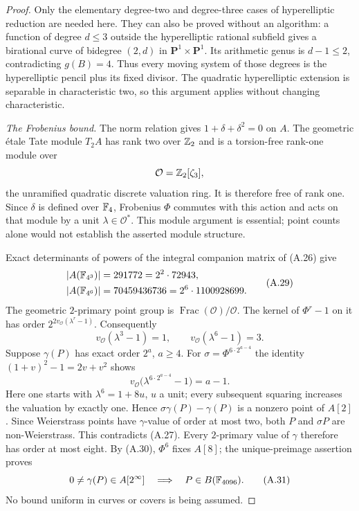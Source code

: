 \begin{proof}
Only the elementary degree-two and degree-three cases of
hyperelliptic reduction are needed here. They can also be
proved without an algorithm: a function of degree $d\le3$
outside the hyperelliptic rational subfield gives a
birational curve of bidegree $(2,d)$ in
$\mathbf P^1\times\mathbf P^1$. Its arithmetic genus is
$d-1\le2$, contradicting $g(B)=4$. Thus every moving
system of those degrees is the hyperelliptic pencil plus
its fixed divisor. The quadratic hyperelliptic extension
is separable in characteristic two, so this argument
applies without changing characteristic.

\emph{The Frobenius bound.}
The norm relation gives $1+\delta+\delta^2=0$ on $A$.
The geometric \'etale Tate module $T_2A$ has rank two
over $\mathbb Z_2$ and is a torsion-free rank-one module over
\[
 \mathcal O=\mathbb Z_2[\zeta_3],
\]
the unramified quadratic discrete valuation ring. It is
therefore free of rank one. Since $\delta$ is defined over
$\mathbb F_4$, Frobenius $\Phi$ commutes with this action and
acts on that module by a unit $\lambda\in\mathcal O^*$.
This module argument is essential; point counts alone
would not establish the asserted module structure.

Exact determinants of powers of the integral companion
matrix of (A.26) give
\[
 \begin{aligned}
 |A(\mathbb F_{4^3})|&=291772=2^2\cdot72943,\\
 |A(\mathbb F_{4^6})|&=70459436736=2^6\cdot1100928699.
 \end{aligned}                                         \tag{A.29}
\]
The geometric $2$-primary point group is
$\operatorname{Frac}(\mathcal O)/\mathcal O$. The kernel
of $\Phi^r-1$ on it has order
$2^{2v_{\mathcal O}(\lambda^r-1)}$. Consequently
\[
 v_{\mathcal O}(\lambda^3-1)=1,
 \qquad v_{\mathcal O}(\lambda^6-1)=3.                  \tag{A.30}
\]
Suppose $\gamma(P)$ has exact order $2^a$, $a\ge4$.
For $\sigma=\Phi^{6\cdot2^{a-4}}$ the identity
$(1+v)^2-1=2v+v^2$ shows
\[
 v_{\mathcal O}\bigl(\lambda^{6\cdot2^{a-4}}-1\bigr)
                                                          =a-1.
\]
Here one starts with $\lambda^6=1+8u$, $u$ a unit;
every subsequent squaring increases the valuation by
exactly one. Hence $\sigma\gamma(P)-\gamma(P)$ is a
nonzero point of $A[2]$. Since Weierstrass points have
$\gamma$-value of order at most two, both $P$ and
$\sigma P$ are non-Weierstrass. This contradicts (A.27).
Every $2$-primary value of $\gamma$ therefore has order
at most eight. By (A.30), $\Phi^6$ fixes $A[8]$; the
unique-preimage assertion proves
\[
 0\ne\gamma(P)\in A[2^\infty]
                  \quad\Longrightarrow\quad P\in B(\mathbb F_{4096}).
                                                               \tag{A.31}
\]
No bound uniform in curves or covers is being assumed.


\end{proof}
